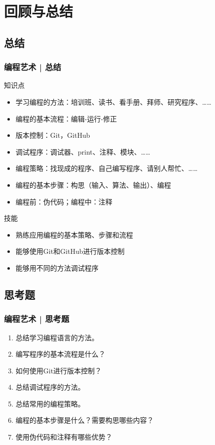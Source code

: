 \section{回顾与总结}
\subsection{总结}
\begin{frame}
  \frametitle{编程艺术 | 总结}
  \begin{block}{知识点}
    \begin{itemize}
      \item 学习编程的方法：培训班、读书、看手册、拜师、研究程序、……
      \item 编程的基本流程：编辑-运行-修正
      \item 版本控制：Git，GitHub
      \item 调试程序：调试器、print、注释、模块、……
      \item 编程策略：找现成的程序、自己编写程序、请别人帮忙、……
      \item 编程的基本步骤：构思（输入、算法、输出）、编程
      \item 编程前：伪代码；编程中：注释
    \end{itemize}
  \end{block}
  \pause
  \begin{block}{技能}
    \begin{itemize}
      \item 熟练应用编程的基本策略、步骤和流程
      \item 能够使用Git和GitHub进行版本控制
      \item 能够用不同的方法调试程序
    \end{itemize}
  \end{block}
\end{frame}

\subsection{思考题}
\begin{frame}
  \frametitle{编程艺术 | 思考题}
  \begin{enumerate}
    \item 总结学习编程语言的方法。
    \item 编写程序的基本流程是什么？
    \item 如何使用Git进行版本控制？
    \item 总结调试程序的方法。
    \item 总结常用的编程策略。
    \item 编程的基本步骤是什么？需要构思哪些内容？
    \item 使用伪代码和注释有哪些优势？
  \end{enumerate}
\end{frame}

